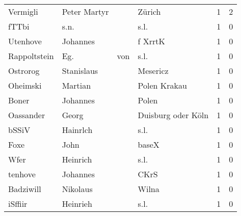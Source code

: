 \begin{tabular}{llllrr}
                 Vermigli &                       Peter Martyr &             &                                      Zürich &          1 &         2 \\
                    fTTbi &                               s.n. &             &                                        s.l. &          1 &         0 \\
                 Utenhove &                           Johannes &             &                                     f XrrtK &          1 &         0 \\
             Rappoltstein &                                Eg. &         von &                                        s.l. &          1 &         0 \\
                 Ostrorog &                         Stanislaus &             &                                    Mesericz &          1 &         0 \\
                 Oheimski &                            Martian &             &                                Polen Krakau &          1 &         0 \\
                    Boner &                           Johannes &             &                                       Polen &          1 &         0 \\
                Oassander &                              Georg &             &                          Duisburg oder Köln &          1 &         0 \\
                    bSSiV &                           Hainrlch &             &                                        s.l. &          1 &         0 \\
                     Foxe &                               John &             &                                       baseX &          1 &         0 \\
                     Wfer &                           Heinrich &             &                                        s.l. &          1 &         0 \\
                  tenhove &                           Johannes &             &                                        CKrS &          1 &         0 \\
                Badziwill &                           Nikolaus &             &                                       Wilna &          1 &         0 \\
                  iSffiir &                           Heinrieh &             &                                        s.l. &          1 &         0 \\

\end{tabular}
